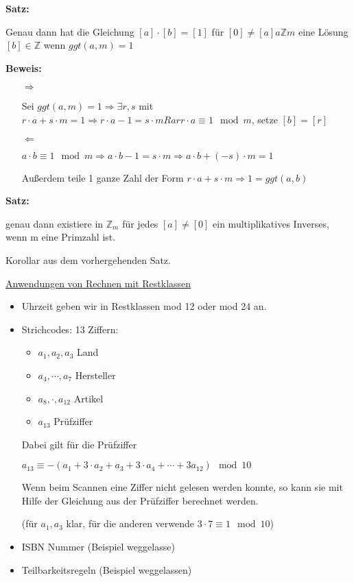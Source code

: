 \documentclass[pdftex,12pt,a4paper,fleqn]{scrartcl}
\begin{document}
\textbf{Satz:}

Genau dann hat die Gleichung $[a] \cdot [b] = [1]$ für $[0] \neq [a] a \mathbb{Z} m$ eine Lösung $[b] \in \mathbb{Z}$ wenn $ggt(a,m) = 1$

\textbf{Beweis:}

\begin{itemize}
	\item[$\Rightarrow$]

	Sei $ggt(a,m) = 1 \Rightarrow \exists r,s$ mit $r \cdot a + s \cdot m =1 \Rightarrow r \cdot a -1 = s \cdot m Rar r \cdot a \equiv 1 \mod m$, setze $[b]=[r]$

	\item[$\Leftarrow$]

	$a \cdot b \equiv 1 \mod m \Rightarrow a \cdot b -1 = s \cdot m \Rightarrow a \cdot b + (-s) \cdot m = 1$

	Außerdem teile 1 ganze Zahl der Form $r \cdot a + s \cdot m \Rightarrow 1 = ggt(a,b)$
\end{itemize}

\textbf{Satz:} 

genau dann existiere in $\mathbb{Z}_m$ für jedes $[a] \neq [0]$ ein multiplikatives Inverses, wenn m eine Primzahl ist.

Korollar aus dem vorhergehenden Satz.

\underline{Anwendungen von Rechnen mit Restklassen}
\begin{itemize}
	\item Uhrzeit geben wir in Restklassen mod 12 oder mod 24 an.
	\item Strichcodes: 13 Ziffern:
	\begin{itemize}
		\item $a_1,a_2,a_3$ Land
		\item $a_4,\cdots,a_7$ Hersteller
		\item $a_8,\cdot,a_{12}$ Artikel
		\item $a_{13}$ Prüfziffer
	\end{itemize}
	Dabei gilt für die Prüfziffer

	$a_{13} \equiv -(a_1+3 \cdot a_2 + a_3 +3 \cdot a_4 + \cdots + 3 a_{12}) \mod 10$

	Wenn beim Scannen eine Ziffer nicht gelesen werden konnte, so kann sie mit Hilfe der Gleichung aus der Prüfziffer berechnet werden.

	(für $a_1,a_3$ klar, für die anderen verwende $3 \cdot 7 \equiv 1 \mod 10$)
	\item ISBN Nummer (Beispiel weggelasse)
	\item Teilbarkeitsregeln (Beispiel weggelassen)
\end{itemize}
\end{document}
